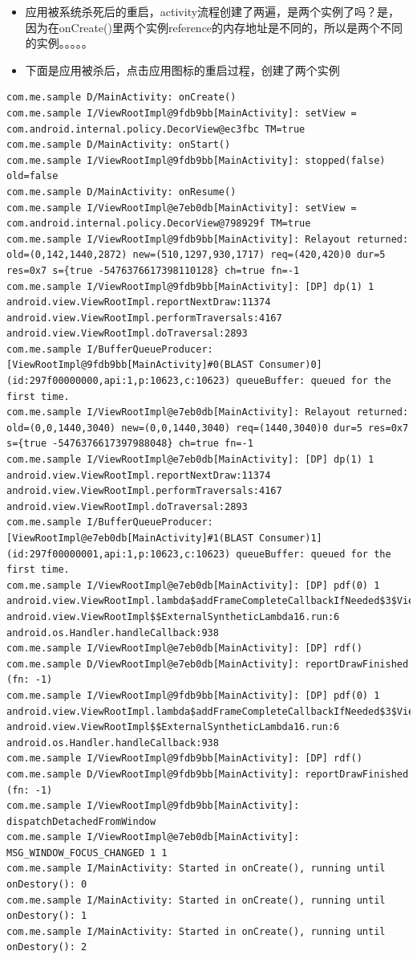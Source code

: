 \documentclass[9pt, b5paper]{article}
\begin{document}
\begin{itemize}
\item 应用被系统杀死后的重启，activity流程创建了两遍，是两个实例了吗？是，因为在onCreate()里两个实例reference的内存地址是不同的，所以是两个不同的实例。。。。。
\item 下面是应用被杀后，点击应用图标的重启过程，创建了两个实例
\end{itemize}
\begin{verbatim}
com.me.sample D/MainActivity: onCreate() 
com.me.sample I/ViewRootImpl@9fdb9bb[MainActivity]: setView = com.android.internal.policy.DecorView@ec3fbc TM=true
com.me.sample D/MainActivity: onStart() 
com.me.sample I/ViewRootImpl@9fdb9bb[MainActivity]: stopped(false) old=false
com.me.sample D/MainActivity: onResume() 
com.me.sample I/ViewRootImpl@e7eb0db[MainActivity]: setView = com.android.internal.policy.DecorView@798929f TM=true
com.me.sample I/ViewRootImpl@9fdb9bb[MainActivity]: Relayout returned: old=(0,142,1440,2872) new=(510,1297,930,1717) req=(420,420)0 dur=5 res=0x7 s={true -5476376617398110128} ch=true fn=-1
com.me.sample I/ViewRootImpl@9fdb9bb[MainActivity]: [DP] dp(1) 1 android.view.ViewRootImpl.reportNextDraw:11374 android.view.ViewRootImpl.performTraversals:4167 android.view.ViewRootImpl.doTraversal:2893 
com.me.sample I/BufferQueueProducer: [ViewRootImpl@9fdb9bb[MainActivity]#0(BLAST Consumer)0](id:297f00000000,api:1,p:10623,c:10623) queueBuffer: queued for the first time.
com.me.sample I/ViewRootImpl@e7eb0db[MainActivity]: Relayout returned: old=(0,0,1440,3040) new=(0,0,1440,3040) req=(1440,3040)0 dur=5 res=0x7 s={true -5476376617397988048} ch=true fn=-1
com.me.sample I/ViewRootImpl@e7eb0db[MainActivity]: [DP] dp(1) 1 android.view.ViewRootImpl.reportNextDraw:11374 android.view.ViewRootImpl.performTraversals:4167 android.view.ViewRootImpl.doTraversal:2893 
com.me.sample I/BufferQueueProducer: [ViewRootImpl@e7eb0db[MainActivity]#1(BLAST Consumer)1](id:297f00000001,api:1,p:10623,c:10623) queueBuffer: queued for the first time.
com.me.sample I/ViewRootImpl@e7eb0db[MainActivity]: [DP] pdf(0) 1 android.view.ViewRootImpl.lambda$addFrameCompleteCallbackIfNeeded$3$ViewRootImpl:4969 android.view.ViewRootImpl$$ExternalSyntheticLambda16.run:6 android.os.Handler.handleCallback:938 
com.me.sample I/ViewRootImpl@e7eb0db[MainActivity]: [DP] rdf()
com.me.sample D/ViewRootImpl@e7eb0db[MainActivity]: reportDrawFinished (fn: -1) 
com.me.sample I/ViewRootImpl@9fdb9bb[MainActivity]: [DP] pdf(0) 1 android.view.ViewRootImpl.lambda$addFrameCompleteCallbackIfNeeded$3$ViewRootImpl:4969 android.view.ViewRootImpl$$ExternalSyntheticLambda16.run:6 android.os.Handler.handleCallback:938 
com.me.sample I/ViewRootImpl@9fdb9bb[MainActivity]: [DP] rdf()
com.me.sample D/ViewRootImpl@9fdb9bb[MainActivity]: reportDrawFinished (fn: -1) 
com.me.sample I/ViewRootImpl@9fdb9bb[MainActivity]: dispatchDetachedFromWindow
com.me.sample I/ViewRootImpl@e7eb0db[MainActivity]: MSG_WINDOW_FOCUS_CHANGED 1 1
com.me.sample I/MainActivity: Started in onCreate(), running until onDestory(): 0
com.me.sample I/MainActivity: Started in onCreate(), running until onDestory(): 1
com.me.sample I/MainActivity: Started in onCreate(), running until onDestory(): 2


\end{verbatim}
\end{document}
